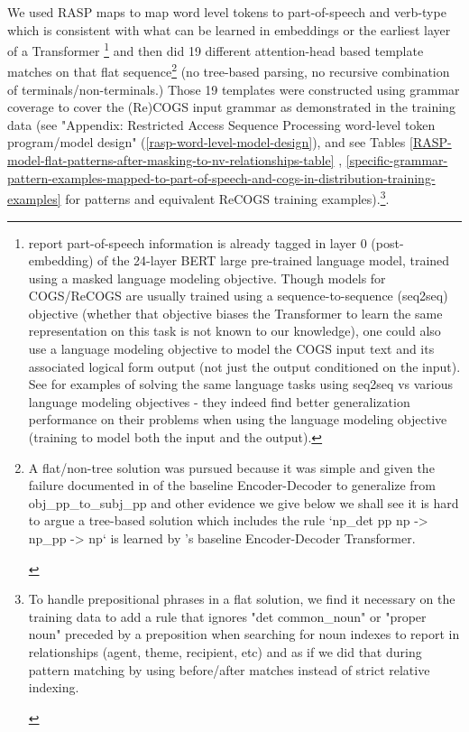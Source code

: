 \documentclass[11pt]{article}
\begin{document}
We used RASP maps to map word level tokens to part-of-speech and verb-type which is consistent with what can be learned in embeddings or the earliest layer of a Transformer \cite{tenney2019bertrediscoversclassicalnlp}\footnote{\cite{tenney2019bertrediscoversclassicalnlp} report part-of-speech information is already tagged in layer 0 (post-embedding) of the 24-layer BERT large pre-trained language model, trained using a masked language modeling objective. Though models for COGS/ReCOGS are usually trained using a sequence-to-sequence (seq2seq) objective (whether that objective biases the Transformer to learn the same representation on this task is not known to our knowledge), one could also use a language modeling objective to model the COGS input text and its associated logical form output (not just the output conditioned on the input). See \cite{10.1162/tacl_a_00733} for examples of solving the same language tasks using seq2seq vs various language modeling objectives - they indeed find better generalization performance on their problems when using the language modeling objective (training to model both the input and the output).} and then did 19 different attention-head based template matches on that flat sequence\footnote{\begin{footnotesize}A flat/non-tree solution was pursued because it was simple and given the failure documented in \cite{Wu2023} of the baseline Encoder-Decoder to generalize from obj\_pp\_to\_subj\_pp and other evidence we give below we shall see it is hard to argue a tree-based solution which includes the rule `np\_det pp np -> np\_pp -> np` is learned by \cite{Wu2023}'s baseline Encoder-Decoder Transformer.\end{footnotesize}} (no tree-based parsing, no recursive combination of terminals/non-terminals.) Those 19 templates were constructed using grammar coverage \cite{fuzzingbook2023:GrammarCoverageFuzzer} to cover the (Re)COGS input grammar as demonstrated in the training data (see "Appendix: Restricted Access Sequence Processing word-level token program/model design" (\ref{rasp-word-level-model-design}), and see Tables \ref{RASP-model-flat-patterns-after-masking-to-nv-relationships-table} , \ref{specific-grammar-pattern-examples-mapped-to-part-of-speech-and-cogs-in-distribution-training-examples} for patterns and equivalent ReCOGS training examples).\footnote{\begin{footnotesize}To handle prepositional phrases in a flat solution, we find it necessary on the training data to add a rule that ignores "det common\_noun" or "proper noun" preceded by a preposition when searching for noun indexes to report in relationships (agent, theme, recipient, etc) and as if we did that during pattern matching by using before/after matches instead of strict relative indexing.\end{footnotesize}}.
\end{document}
